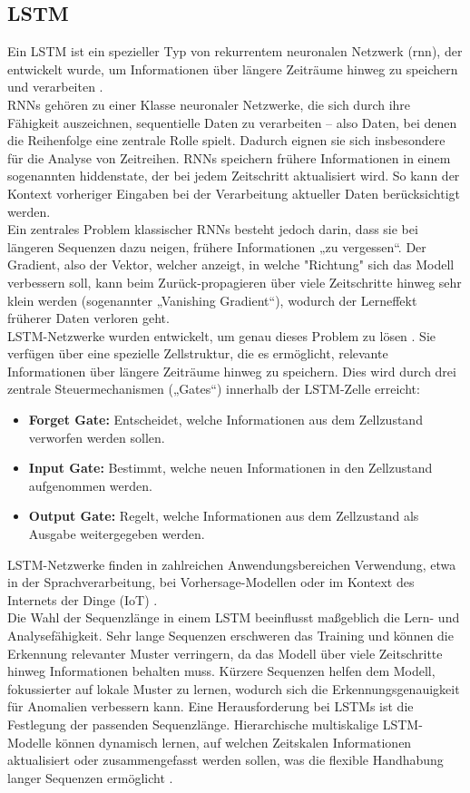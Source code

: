 \documentclass[a4paper,12pt]{article}
\begin{document}
	\subsection{LSTM}
	Ein LSTM ist ein spezieller Typ von rekurrentem neuronalen Netzwerk (\gls{rnn}), der entwickelt wurde, um Informationen über längere Zeiträume hinweg zu speichern und verarbeiten \cite{hochreiter1997long}.
	\\[0.5em]
	RNNs gehören zu einer Klasse neuronaler Netzwerke, die sich durch ihre Fähigkeit auszeichnen, sequentielle Daten zu verarbeiten – also Daten, bei denen die Reihenfolge eine zentrale Rolle spielt. Dadurch eignen sie sich insbesondere für die Analyse von Zeitreihen. RNNs speichern frühere Informationen in einem sogenannten \gls{hiddenstate}, der bei jedem Zeitschritt aktualisiert wird. So kann der Kontext vorheriger Eingaben bei der Verarbeitung aktueller Daten berücksichtigt werden.
	\\[0.5em]
	Ein zentrales Problem klassischer RNNs besteht jedoch darin, dass sie bei längeren Sequenzen dazu neigen, frühere Informationen „zu vergessen“. Der Gradient, also der Vektor, welcher anzeigt, in welche "Richtung" sich das Modell verbessern soll, kann beim Zurück-propagieren über viele Zeitschritte hinweg sehr klein werden (sogenannter „Vanishing Gradient“), wodurch der Lerneffekt früherer Daten verloren geht.
	\\[0.5em]
	LSTM-Netzwerke wurden entwickelt, um genau dieses Problem zu lösen \cite[S.19]{staudemeyer2019understanding}. Sie verfügen über eine spezielle Zellstruktur, die es ermöglicht, relevante Informationen über längere Zeiträume hinweg zu speichern. Dies wird durch drei zentrale Steuermechanismen („Gates“) innerhalb der LSTM-Zelle erreicht:
	\begin{itemize}
		\item \textbf{Forget Gate:} Entscheidet, welche Informationen aus dem Zellzustand verworfen werden sollen.
		\item \textbf{Input Gate:} Bestimmt, welche neuen Informationen in den Zellzustand aufgenommen werden.
		\item \textbf{Output Gate:} Regelt, welche Informationen aus dem Zellzustand als Ausgabe weitergegeben werden.
	\end{itemize}
	LSTM-Netzwerke finden in zahlreichen Anwendungsbereichen Verwendung, etwa in der Sprachverarbeitung, bei Vorhersage-Modellen oder im Kontext des Internets der Dinge (IoT) \cite{wei2022lstm}.
	\\[0.5em]
	Die Wahl der Sequenzlänge in einem LSTM beeinflusst maßgeblich die Lern- und Analysefähigkeit. Sehr lange Sequenzen erschweren das Training und können die Erkennung relevanter Muster verringern, da das Modell über viele Zeitschritte hinweg Informationen behalten muss. Kürzere Sequenzen helfen dem Modell, fokussierter auf lokale Muster zu lernen, wodurch sich die Erkennungsgenauigkeit für Anomalien verbessern kann. Eine Herausforderung bei LSTMs ist die Festlegung der passenden Sequenzlänge. Hierarchische multiskalige LSTM-Modelle können dynamisch lernen, auf welchen Zeitskalen Informationen aktualisiert oder zusammengefasst werden sollen, was die flexible Handhabung langer Sequenzen ermöglicht \cite{chung2017hierarchical}.
\end{document}
